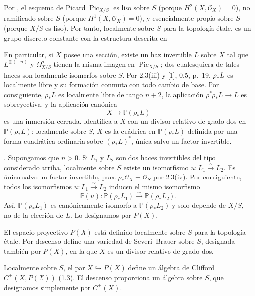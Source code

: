 Por , el esquema de Picard
$\operatorname{Pic}_{X/S}$ es liso sobre $S$ (porque
$H^2(X,\mathcal O_X)=0$), no ramificado sobre $S$ (porque
$H^1(X,\mathcal O_X)=0$), y esencialmente propio sobre $S$ (porque $X/S$
es liso). Por tanto, localmente sobre $S$ para la topología étale, es un
grupo discreto constante con la estructura descrita en
.


En particular, si $X$ posee una sección, existe un haz invertible $L$ sobre
$X$ tal que $L^{\otimes(-n)}$ y $\Omega^n_{X/S}$ tienen la misma imagen en
$\operatorname{Pic}_{X/S}$; dos cualesquiera de tales haces son localmente
isomorfos sobre $S$. Por 2.3(iii) y [1], 0.5, p.~19,
$\sisi{p}{\rho}_*L$ es localmente libre y su formación conmuta con todo
cambio de base. Por consiguiente, $\rho_*L$ es localmente libre de rango
$n+2$, la aplicación $\rho^*\rho_*L\longrightarrow L$ es sobreyectiva, y
la aplicación canónica
\begin{equation*}
X\longrightarrow\mathbb P(\rho_*L)
\end{equation*}
es una inmersión cerrada. Identifica a $X$ con un divisor relativo de grado
dos en $\mathbb P(\rho_*L)$; localmente sobre $S$, $X$ es la cuádrica en
$\mathbb P(\rho_*L)$ definida por una forma cuadrática ordinaria sobre
$(\rho_*L)^*$, única salvo un factor invertible.


\medskip
{}. Supongamos que $n>0$. Si $L_1$ y $L_2$ son dos haces
invertibles del tipo considerado arriba, localmente sobre $S$ existe un
isomorfismo $u:L_1\xrightarrow{\sim}L_2$. Es único salvo un factor
invertible, pues $\rho_*\mathcal O_X=\mathcal O_S$ por 2.3(iv). Por
consiguiente, todos los isomorfismos $u:L_1\xrightarrow{\sim}L_2$ inducen
el mismo isomorfismo
\begin{equation*}
\mathbb P(u):\mathbb P(\rho_*L_1)\xrightarrow{\sim}
\mathbb P(\rho_*L_2).
\end{equation*}
Así, $\mathbb P(\rho_*L_1)$ es canónicamente isomorfo a
$\mathbb P(\rho_*L_2)$ y solo depende de $X/S$, no de la elección de $L$.
Lo designamos por $P(X)$.

\pageoriginale

El espacio proyectivo $P(X)$ está definido localmente sobre $S$ para la
topología étale. Por descenso define una variedad de Severi--Brauer sobre
$S$, designada también por $P(X)$, en la que $X$ es un divisor relativo de
grado dos.

Localmente sobre $S$, el par $X\hookrightarrow P(X)$ define un álgebra de
Clifford $C^+(X,P(X))$ (1.3). El descenso proporciona un álgebra sobre $S$,
que designamos simplemente por $C^+(X)$.

